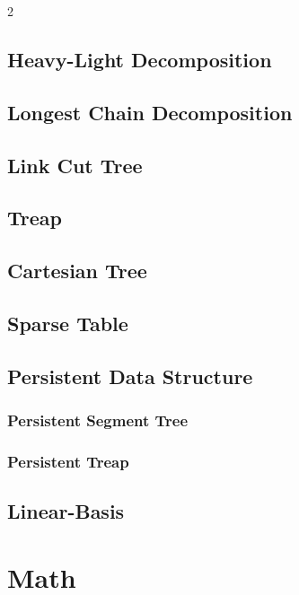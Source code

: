 \documentclass[10pt,a4paper]{article}
\begin{document}
\begin{multicols}{2}
\subsection{Heavy-Light Decomposition}

\subsection{Longest Chain Decomposition}

\subsection{Link Cut Tree}

\subsection{Treap}

\subsection{Cartesian Tree}

\subsection{Sparse Table}

\subsection{Persistent Data Structure}
\subsubsection{Persistent Segment Tree}


\subsubsection{Persistent Treap}


\subsection{Linear-Basis}



\newpage

\section{Math}


\end{multicols}
\end{document}
